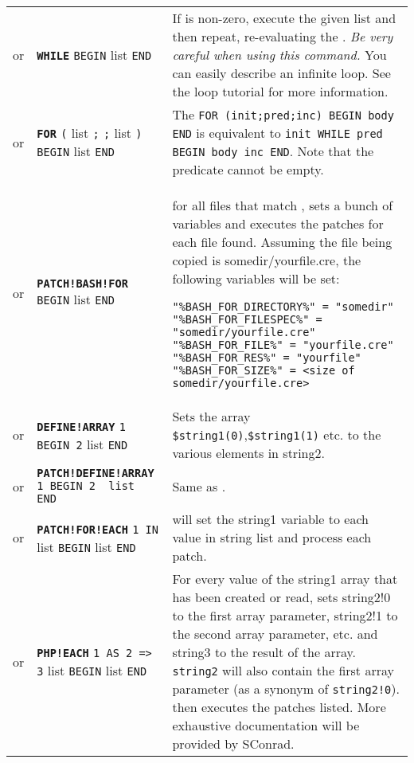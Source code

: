 \documentclass{article}
\def\ttref#1{\ahrefloc{#1}{\tt #1}}
\def\DEFINE#1{{\tt \bf #1}\label{#1}\index{#1}}
\def\DEFSYN#1{{\tt \bf #1}\index{#1}}
\def\t#1{{\tt #1}}
\def\Slist{{\color{red} list }}
\begin{document}
\begin{tabular}{cp{10in}|p{10in}}
or & \DEFSYN{WHILE} \ttref{value} \t{BEGIN} 
  \ttref{patch} \Slist \t{END} & 
  If \ttref{value} is non-zero, execute the given \ttref{patch} \Slist and
  then repeat, re-evaluating the \ttref{value}. 
  {\em Be very careful when using this command. } You can easily describe
  an infinite loop. See the \ttref{WHILE} loop tutorial for more
  information. 
  \\
or & \DEFINE{FOR} \t{(} \ttref{patch} \Slist \t{;}
                        \ttref{value} \t{;}
                        \ttref{patch} \Slist \t{)} 
                  \t{BEGIN} \ttref{patch} \Slist \t{END} &
  The \ttref{patch} \t{FOR (init;pred;inc) BEGIN body END} is equivalent to
  \t{init WHILE pred BEGIN body inc END}. Note that the predicate
  \ttref{value} cannot be empty.  \\
or & \DEFINE{PATCH!BASH!FOR} \ttref{directory-file-regexp} \t{BEGIN} \ttref{patch} \Slist \t{END} &
  for all files that match \ttref{directory-file-regexp}, sets a bunch of variables
  and executes the patches for each file found. Assuming the file being copied
  is somedir/yourfile.cre, the following variables will be set:
\begin{verbatim}
"%BASH_FOR_DIRECTORY%" = "somedir"
"%BASH_FOR_FILESPEC%" = "somedir/yourfile.cre"
"%BASH_FOR_FILE%" = "yourfile.cre"
"%BASH_FOR_RES%" = "yourfile"
"%BASH_FOR_SIZE%" = <size of somedir/yourfile.cre>
\end{verbatim}            \\

or & \DEFINE{DEFINE!ARRAY} \t{\ttref{String}1 BEGIN \ttref{String}2} \Slist \t{END} &
	Sets the array \verb+$string1(0)+,\verb+$string1(1)+ etc. to the various elements in string2.
\\

or & \DEFINE{PATCH!DEFINE!ARRAY} \t{\ttref{String}1 BEGIN \ttref{String}2 \Slist END} &
	Same as \ttref{DEFINE!ARRAY}.
\\


or & \DEFINE{PATCH!FOR!EACH} \t{\ttref{String}1 IN \ttref{String}} \Slist
                             \t{BEGIN} \ttref{patch} \Slist \t{END} &
    will set the string1 variable to each value in string list and process each patch. \\

or & \DEFINE{PHP!EACH} \t{\ttref{String}1 AS \ttref{String}2 => \ttref{String}3} \Slist
                       \t{BEGIN} \ttref{patch} \Slist \t{END} &
    For every value of the string1 array that has been created or read, sets
    string2!0 to the first array parameter, string2!1 to the second array
    parameter, etc. and string3 to the result of the array. \verb+string2+ will also contain
		the first array parameter (as a synonym of \verb+string2!0+). then executes the
    patches listed. More exhaustive documentation will be provided by SConrad.
\\


\end{tabular}
\end{document}
